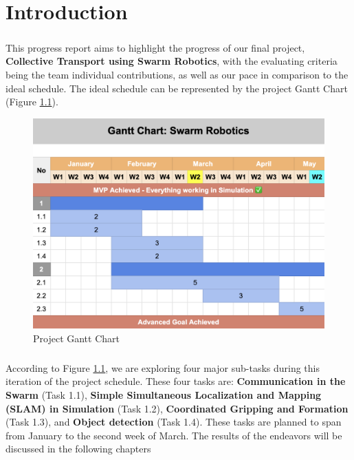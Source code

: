 \chapter{Introduction}

\paragraph*{}
This progress report aims to highlight the progress of our final project, \textbf{Collective Transport using Swarm Robotics}, with the evaluating criteria being the team individual contributions, as well as our pace in comparison to the ideal schedule. The ideal schedule can be represented by the project Gantt Chart (Figure \ref{fig:gantt_chart}).

\begin{figure}[H]
    \centering
    \includegraphics[width=1\linewidth]{assets/images/timeline/gantt_chart.png}
    \caption{Project Gantt Chart}
    \label{fig:gantt_chart}
\end{figure}

\paragraph*{}
According to Figure \ref{fig:gantt_chart}, we are exploring four major sub-tasks during this iteration of the project schedule. These four tasks are: \textbf{Communication in the Swarm} (Task 1.1), \textbf{Simple Simultaneous Localization and Mapping (SLAM) in Simulation} (Task 1.2), \textbf{Coordinated Gripping and Formation} (Task 1.3), and \textbf{Object detection} (Task 1.4). These tasks are planned to span from January to the second week of March. The results of the endeavors will be discussed in the following chapters


